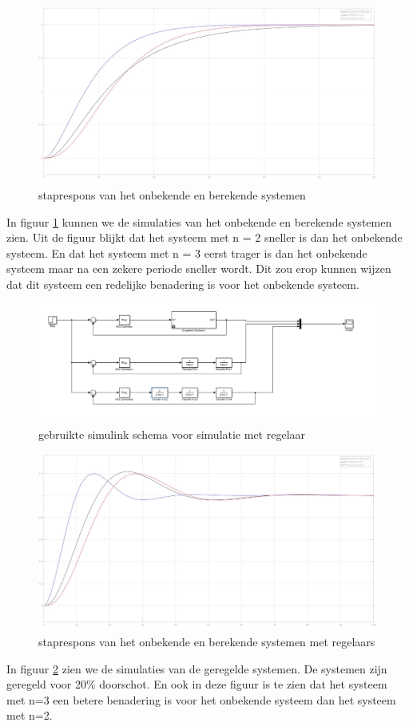 \documentclass[a4paper, 12pt]{article}
\begin{document}
\begin{figure}[!h]
	\includegraphics[width=1\linewidth]{Labo2_3_scoop.jpg}
	\caption{staprespons van het onbekende en berekende systemen}
	\label{fig:scoop2.4.1}
\end{figure}

In figuur \ref{fig:scoop2.4.1} kunnen we de simulaties van het onbekende en berekende systemen zien. Uit de figuur blijkt dat het systeem met n = 2 sneller is dan het onbekende systeem. En dat het systeem met n = 3 eerst trager is dan het onbekende systeem maar na een zekere periode sneller wordt. Dit zou erop kunnen wijzen dat dit systeem een redelijke benadering is voor het onbekende systeem.

\newpage

\begin{figure}[!h]
	\includegraphics[width=1\linewidth]{Labo2_3_regeling.jpg}
	\caption{gebruikte simulink schema voor simulatie met regelaar}
\end{figure}

\begin{figure}[!h]
	\includegraphics[width=1\linewidth]{Labo2_3_scoop2.jpg}
	\caption{staprespons van het onbekende en berekende systemen met regelaars}
	\label{fig:scoop2.4.2}
\end{figure}

In figuur \ref{fig:scoop2.4.2} zien we de simulaties van de geregelde systemen. De systemen zijn geregeld voor 20\% doorschot. En ook in deze figuur is te zien dat het systeem met n=3 een betere benadering is voor het onbekende systeem dan het systeem met n=2.
\end{document}
